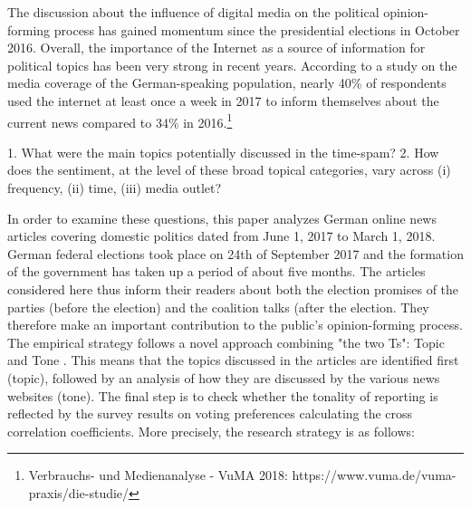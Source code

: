 \documentclass[12pt,a4paper,notitlepage]{article}
\begin{document}

The discussion about the influence of digital media on the political opinion-forming process has gained momentum since the presidential elections in October 2016. Overall, the importance of the Internet as a source of information for political topics has been very strong in recent years. According to a study on the media coverage of the German-speaking population, nearly 40\% of respondents used the internet at least once a week in 2017 to inform themselves about the current news compared to 34\% in 2016.\footnote{Verbrauchs- und Medienanalyse - VuMA 2018: https://www.vuma.de/vuma-praxis/die-studie/}

1. What were the main topics potentially discussed in the time-spam? 
2. How does the sentiment, at the level of these broad topical categories, vary across (i) frequency, (ii) time, (iii) media outlet?

In order to examine these questions, this paper analyzes German online news articles covering domestic politics dated from June 1, 2017 to March 1, 2018. German federal elections took place on 24th of September 2017 and the formation of the government has taken up a period of about five months. The articles considered here thus inform their readers about both the election promises of the parties (before the election) and the coalition talks (after the election. They therefore make an important contribution to the public's opinion-forming process. The empirical strategy follows a novel approach combining "the two Ts": Topic and Tone \citep{hansen_shocking_2016}. This means that the topics discussed in the articles are identified first (topic), followed by an analysis of how they are discussed by the various news websites (tone). The final step is to check whether the tonality of reporting is reflected by the survey results on voting preferences calculating the cross correlation coefficients. More precisely, the research strategy is as follows:
\end{document}
